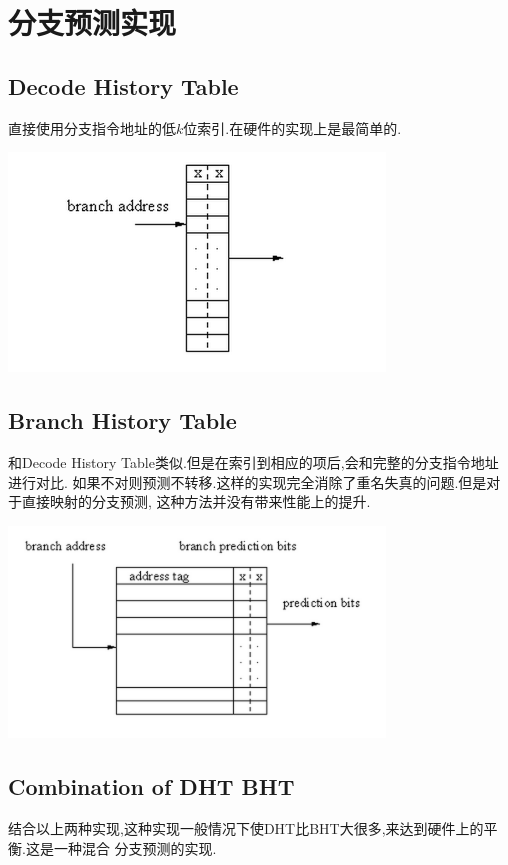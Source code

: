 \documentclass[adobefonts, nocap]{ctexart}
\begin{document}
  \section{分支预测实现}
    \subsection{Decode History Table}
      直接使用分支指令地址的低$k$位索引.在硬件的实现上是最简单的.

      \begin{center}
        \includegraphics[width=10cm]{4.png}
      \end{center}
    \subsection{Branch History Table}
      和Decode History Table类似.但是在索引到相应的项后,会和完整的分支指令地址进行对比.
      如果不对则预测不转移.这样的实现完全消除了重名失真的问题.但是对于直接映射的分支预测,
      这种方法并没有带来性能上的提升.

      \begin{center}
        \includegraphics[width=10cm]{5.png}
      \end{center}
    \subsection{Combination of DHT BHT}
      结合以上两种实现,这种实现一般情况下使DHT比BHT大很多,来达到硬件上的平衡.这是一种混合
      分支预测的实现.
\end{document}
